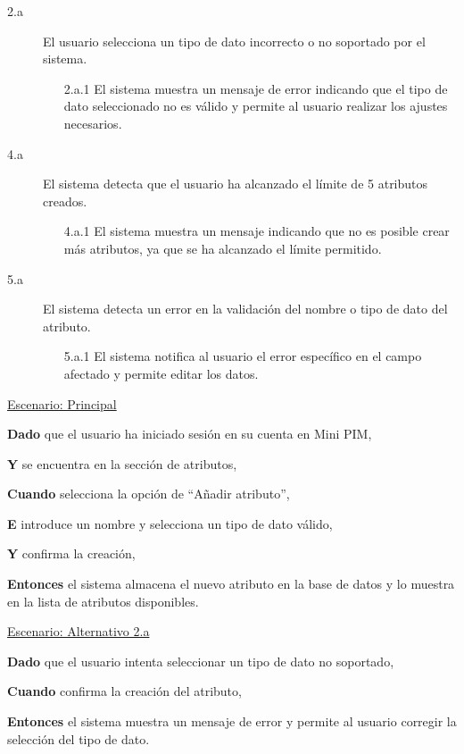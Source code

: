 \begin{description}
    \item[2.a] El usuario selecciona un tipo de dato incorrecto o no soportado por el sistema.
    \begin{enumerate}
        \item[2.a.1] El sistema muestra un mensaje de error indicando que el tipo de dato seleccionado no es válido y permite al usuario realizar los ajustes necesarios.
    \end{enumerate}

    \item[4.a] El sistema detecta que el usuario ha alcanzado el límite de 5 atributos creados.
    \begin{enumerate}
        \item[4.a.1] El sistema muestra un mensaje indicando que no es posible crear más atributos, ya que se ha alcanzado el límite permitido.
    \end{enumerate}

    \item[5.a] El sistema detecta un error en la validación del nombre o tipo de dato del atributo.
    \begin{enumerate}
        \item[5.a.1] El sistema notifica al usuario el error específico en el campo afectado y permite editar los datos.
    \end{enumerate}
\end{description}

\underline{Escenario: Principal}\par
\vspace{0.15cm}
\textbf{Dado} que el usuario ha iniciado sesión en su cuenta en Mini PIM,\par
\textbf{Y} se encuentra en la sección de atributos,\par
\textbf{Cuando} selecciona la opción de “Añadir atributo”,\par
\textbf{E} introduce un nombre y selecciona un tipo de dato válido,\par
\textbf{Y} confirma la creación,\par
\textbf{Entonces} el sistema almacena el nuevo atributo en la base de datos y lo muestra en la lista de atributos disponibles.\par
\vspace{0.20cm}

\underline{Escenario: Alternativo 2.a}\par
\vspace{0.15cm}
\textbf{Dado} que el usuario intenta seleccionar un tipo de dato no soportado,\par
\textbf{Cuando} confirma la creación del atributo,\par
\textbf{Entonces} el sistema muestra un mensaje de error y permite al usuario corregir la selección del tipo de dato.\par
\vspace{0.20cm}

